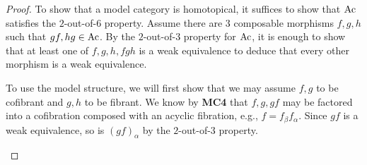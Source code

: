 \documentclass[../thesis.tex]{subfiles}
\begin{document}
            \begin{proof}
                To show that a model category is homotopical, it suffices to show that $\tt{Ac}$ satisfies the $2$-out-of-$6$ property. Assume there are $3$ composable morphisms $f,g,h$ such that $gf,hg\in \tt{Ac}$. By the $2$-out-of-$3$ property for $\tt{Ac}$, it is enough to show that at least one of $f,g,h,fgh$ is a weak equivalence to deduce that every other morphism is a weak equivalence.
                \begin{center}
                \end{center}

                To use the model structure, we will first show that we may assume $f,g$ to be cofibrant and $g,h$ to be fibrant. We know by \textbf{MC4} that $f,g,gf$ may be factored into a cofibration composed with an acyclic fibration, e.g., $f = f_\beta f_\alpha$. Since $gf$ is a weak equivalence, so is $(gf)_\alpha$ by the $2$-out-of-$3$ property.
                \begin{center}
                \end{center}


\end{proof}
\end{document}
